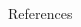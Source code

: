 \begin{frame}[allowframebreaks]{References}
\begin{thebibliography}{99}
	\small
	\printbibliography
\end{thebibliography}
\end{frame}
